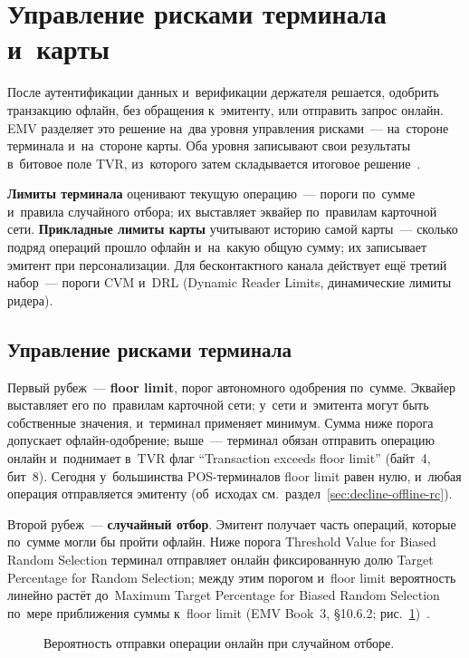 \section{Управление рисками терминала и~карты}\label{sec:emv-risk-mgmt}

После аутентификации данных и~верификации держателя решается, одобрить
транзакцию офлайн, без обращения к~эмитенту, или отправить запрос онлайн. EMV
разделяет это решение на~два уровня управления рисками~--- на~стороне
терминала и~на~стороне карты. Оба уровня записывают свои результаты в~битовое
поле TVR, из~которого затем складывается итоговое решение~\cite{emvco-book3}.

\textbf{Лимиты терминала} оценивают текущую операцию~--- пороги по~сумме
и~правила случайного отбора; их выставляет эквайер по~правилам карточной сети.
\textbf{Прикладные лимиты карты} учитывают историю самой карты~--- сколько
подряд операций прошло офлайн и~на~какую общую сумму; их записывает эмитент при
персонализации. Для бесконтактного канала действует ещё третий набор~--- пороги
CVM и~DRL (Dynamic Reader Limits, динамические лимиты ридера).

\subsection*{Управление рисками терминала}

Первый рубеж~--- \textbf{floor limit}, порог автономного одобрения по~сумме.
Эквайер выставляет его по~правилам карточной сети; у~сети и~эмитента могут быть
собственные значения, и~терминал применяет минимум. Сумма ниже порога допускает
офлайн-одобрение; выше~--- терминал обязан отправить операцию онлайн
и~поднимает в~TVR флаг \enquote{Transaction exceeds floor limit} (байт~4, бит~8). Сегодня у~большинства POS-терминалов floor limit
равен нулю, и~любая операция отправляется эмитенту (об~исходах
см.~раздел~\ref{sec:decline-offline-rc}).

Второй рубеж~--- \textbf{случайный отбор}. Эмитент получает часть операций,
которые по~сумме могли бы пройти офлайн. Ниже порога
Threshold Value for Biased Random Selection терминал отправляет онлайн
фиксированную долю Target Percentage for Random Selection; между этим порогом
и~floor limit вероятность линейно растёт до~Maximum Target Percentage for
Biased Random Selection по~мере приближения суммы к~floor limit (EMV Book~3,
\S10.6.2; рис.~\ref{fig:emv-random-selection})~\cite{emvco-book3}.

\begin{figure}[tbp]
  \centering
  \caption{Вероятность отправки операции онлайн при случайном отборе.}\label{fig:emv-random-selection}
\end{figure}

